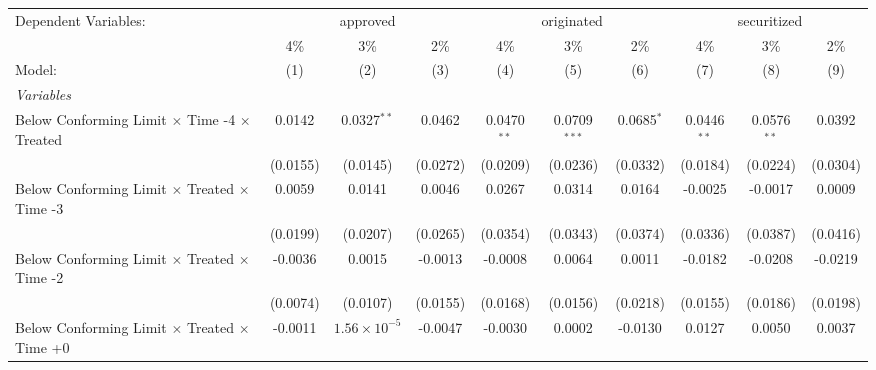 \begingroup
\centering
\begin{tabular}{lccccccccc}
   \tabularnewline \midrule \midrule
   Dependent Variables: & \multicolumn{3}{c}{approved} & \multicolumn{3}{c}{originated} & \multicolumn{3}{c}{securitized}\\
                                                              & 4\%            & 3\%                   & 2\%           & 4\%           & 3\%            & 2\%          & 4\%            & 3\%            & 2\% \\    
   Model:                                                     & (1)            & (2)                   & (3)           & (4)           & (5)            & (6)          & (7)            & (8)            & (9)\\  
   \midrule
   \emph{Variables}\\
   Below Conforming Limit $\times$ Time -4 $\times$ Treated   & 0.0142         & 0.0327$^{**}$         & 0.0462        & 0.0470$^{**}$ & 0.0709$^{***}$ & 0.0685$^{*}$ & 0.0446$^{**}$  & 0.0576$^{**}$  & 0.0392\\   
                                                              & (0.0155)       & (0.0145)              & (0.0272)      & (0.0209)      & (0.0236)       & (0.0332)     & (0.0184)       & (0.0224)       & (0.0304)\\   
   Below Conforming Limit $\times$ Treated $\times$ Time -3   & 0.0059         & 0.0141                & 0.0046        & 0.0267        & 0.0314         & 0.0164       & -0.0025        & -0.0017        & 0.0009\\   
                                                              & (0.0199)       & (0.0207)              & (0.0265)      & (0.0354)      & (0.0343)       & (0.0374)     & (0.0336)       & (0.0387)       & (0.0416)\\   
   Below Conforming Limit $\times$ Treated $\times$ Time -2   & -0.0036        & 0.0015                & -0.0013       & -0.0008       & 0.0064         & 0.0011       & -0.0182        & -0.0208        & -0.0219\\   
                                                              & (0.0074)       & (0.0107)              & (0.0155)      & (0.0168)      & (0.0156)       & (0.0218)     & (0.0155)       & (0.0186)       & (0.0198)\\   
   Below Conforming Limit $\times$ Treated $\times$ Time +0   & -0.0011        & $1.56\times 10^{-5}$  & -0.0047       & -0.0030       & 0.0002         & -0.0130      & 0.0127         & 0.0050         & 0.0037\\   

\end{tabular}
